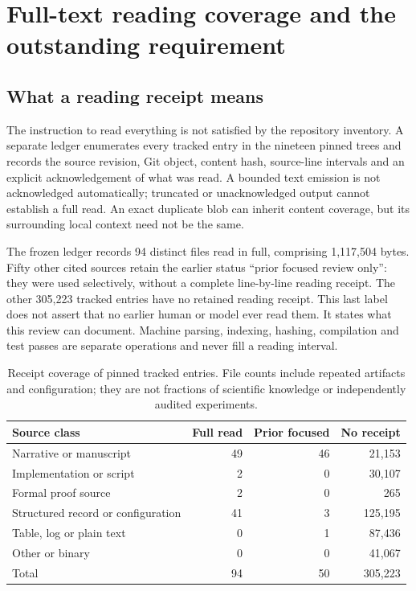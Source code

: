 \section{Full-text reading coverage and the outstanding requirement}\label{app:reading}

\subsection{What a reading receipt means}

The instruction to read everything is not satisfied by the repository
inventory. A separate ledger enumerates every tracked entry in the
nineteen pinned trees and records the source revision, Git object,
content hash, source-line intervals and an explicit acknowledgement of
what was read. A bounded text emission is not acknowledged automatically;
truncated or unacknowledged output cannot establish a full read. An exact
duplicate blob can inherit content coverage, but its surrounding local
context need not be the same.

The frozen ledger records 94 distinct files read in full, comprising
1,117,504 bytes. Fifty other cited sources retain the earlier status
``prior focused review only'': they were used selectively, without a
complete line-by-line reading receipt. The other 305,223 tracked entries
have no retained reading receipt. This last label does not assert that
no earlier human or model ever read them. It states what this review can
document. Machine parsing, indexing, hashing, compilation and test passes
are separate operations and never fill a reading interval.

\begin{table}[htbp]\small
\caption{Receipt coverage of pinned tracked entries. File counts include
repeated artifacts and configuration; they are not fractions of scientific
knowledge or independently audited experiments.}
\begin{tabularx}{\linewidth}{@{}Yrrr@{}}\toprule
Source class & Full read & Prior focused & No receipt \\\midrule
Narrative or manuscript & 49 & 46 & 21,153 \\
Implementation or script & 2 & 0 & 30,107 \\
Formal proof source & 2 & 0 & 265 \\
Structured record or configuration & 41 & 3 & 125,195 \\
Table, log or plain text & 0 & 1 & 87,436 \\
Other or binary & 0 & 0 & 41,067 \\\midrule
Total & 94 & 50 & 305,223 \\\bottomrule
\end{tabularx}
\end{table}

